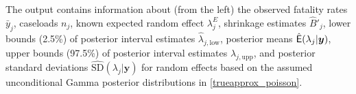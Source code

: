 \documentclass[article]{jss}
\begin{document}
The output contains information about  (from the left) the observed fatality rates $\bar{y}_{j}$, caseloads $n_{j}$, known expected random effect $\lambda^E_j$, shrinkage estimates $\hat{B}'_{j}$, lower bounds (2.5\%) of posterior interval estimates $\hat{\lambda}_{j, \textrm{low}}$, posterior means $\hat{\mathsf{E}}(\lambda_j\vert\boldsymbol{y})$, upper bounds  (97.5\%) of posterior interval estimates $\hat{\lambda}_{j, \textrm{upp}}$, and posterior standard deviations $\widehat{\textrm{SD}}(\lambda_j\vert\boldsymbol{y})$ for  random effects based on the assumed unconditional Gamma posterior distributions in \eqref{trueapprox_poisson}. %

\end{document}
